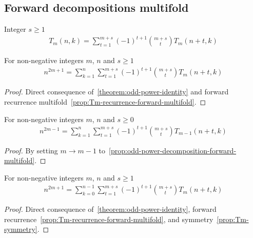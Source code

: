 \subsection{Forward decompositions multifold}
\label{subsec:forward-decompositions-multifold}
\begin{proposition}
    Integer $s \geq 1$
    \label{prop:Tm-recurrence-forward-multifold}
    \begin{align*}
        T_{m} (n,k) = \sum_{t=1}^{m+s} (-1)^{t+1} \binom{m+s}{t} T_{m} (n+t, k)
    \end{align*}
\end{proposition}

\begin{proposition}
    \label{prop:odd-power-decomposition-forward-multifold}
    For non-negative integers $m$, $n$ and $s \geq 1$
    \begin{align*}
        n^{2m+1} = \sum_{k=1}^{n} \sum_{t=1}^{m+s} (-1)^{t+1} \binom{m+s}{t} T_{m} (n+t, k)
    \end{align*}
    \begin{proof}
        Direct consequence of~\eqref{theorem:odd-power-identity}
        and forward recurrence multifold~\eqref{prop:Tm-recurrence-forward-multifold}.
    \end{proof}
\end{proposition}

\begin{proposition}
    \label{prop:odd-power-decomposition-forward-m-1-multifold}
    For non-negative integers $m$, $n$ and $s\geq 0$
    \begin{align*}
        n^{2m-1} = \sum_{k=1}^{n} \sum_{t=1}^{m+s} (-1)^{t+1} \binom{m+s}{t} T_{m-1} (n+t, k)
    \end{align*}
    \begin{proof}
        By setting $m \rightarrow m-1$ to~\eqref{prop:odd-power-decomposition-forward-multifold}.
    \end{proof}
\end{proposition}

\begin{proposition}
    \label{prop:odd-power-decomposition-forward-shifted-multifold}
    For non-negative integers $m$, $n$ and $s\geq 1$
    \begin{align*}
        n^{2m+1} = \sum_{k=0}^{n-1} \sum_{t=1}^{m+s} (-1)^{t+1} \binom{m+s}{t} T_{m} (n+t, k)
    \end{align*}
    \begin{proof}
        Direct consequence of~\eqref{theorem:odd-power-identity},
        forward recurrence~\eqref{prop:Tm-recurrence-forward-multifold}, and symmetry~\eqref{prop:Tm-symmetry}.
    \end{proof}
\end{proposition}

